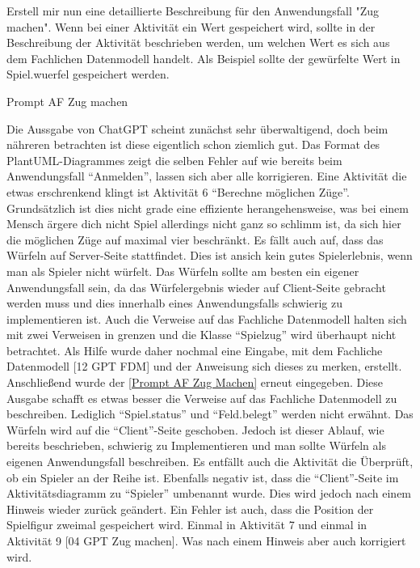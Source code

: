 \begin{prompt}[H]
    \begin{tcolorbox}[colback=gray!20, colframe=gray!20, boxrule=0pt, sharp corners] 
        Erstell mir nun eine detaillierte Beschreibung für den Anwendungsfall "Zug machen". Wenn bei einer Aktivität ein Wert gespeichert wird, sollte 
        in der Beschreibung der Aktivität beschrieben werden, um welchen Wert es sich aus dem Fachlichen Datenmodell handelt. Als Beispiel sollte der 
        gewürfelte Wert in Spiel.wuerfel gespeichert werden.
        \vfill
    \end{tcolorbox}
    \caption{Prompt AF Zug machen}
    \label{Prompt AF Zug Machen}
\end{prompt}

Die Aussgabe von ChatGPT scheint zunächst sehr überwaltigend, doch beim nähreren betrachten ist diese eigentlich schon ziemlich gut. Das Format des PlantUML-Diagrammes
zeigt die selben Fehler auf wie bereits beim Anwendungsfall ``Anmelden'', lassen sich aber alle korrigieren. Eine Aktivität die etwas erschrenkend klingt ist Aktivität 6 
``Berechne möglichen Züge''. Grundsätzlich ist dies nicht grade eine effiziente herangehensweise, was bei einem Mensch ärgere dich nicht Spiel allerdings nicht ganz so
schlimm ist, da sich hier die möglichen Züge auf maximal vier beschränkt. Es fällt auch auf, dass das Würfeln auf Server-Seite stattfindet. Dies ist ansich kein gutes 
Spielerlebnis, wenn man als Spieler nicht würfelt. Das 
Würfeln sollte am besten ein eigener Anwendungsfall sein, da das Würfelergebnis wieder auf Client-Seite gebracht werden muss und dies innerhalb eines Anwendungsfalls
schwierig zu implementieren ist. Auch die Verweise auf das Fachliche Datenmodell halten sich mit zwei Verweisen in grenzen und die Klasse ``Spielzug'' wird überhaupt nicht
betrachtet. Als Hilfe wurde daher nochmal eine Eingabe, mit dem Fachliche Datenmodell [12 GPT FDM] und der Anweisung sich dieses zu merken, erstellt. Anschließend wurde 
der \autoref{Prompt AF Zug Machen} erneut eingegeben. Diese Ausgabe schafft es etwas besser die Verweise auf das Fachliche Datenmodell zu beschreiben. Lediglich ``Spiel.status''
und ``Feld.belegt'' werden nicht erwähnt. Das Würfeln wird auf die ``Client''-Seite geschoben. Jedoch ist dieser Ablauf, wie bereits beschrieben, 
schwierig zu Implementieren und man sollte Würfeln als eigenen Anwendungsfall beschreiben. Es entfällt auch die Aktivität die Überprüft, ob ein Spieler an der Reihe ist. 
Ebenfalls negativ ist, dass die ``Client''-Seite im Aktivitätsdiagramm zu ``Spieler'' 
umbenannt wurde. Dies wird jedoch nach einem Hinweis wieder zurück geändert. Ein Fehler ist auch, dass die Position der Spielfigur zweimal gespeichert wird. Einmal in Aktivität 7
und einmal in Aktivität 9 [04 GPT Zug machen]. Was nach einem Hinweis aber auch korrigiert wird.\\ %


